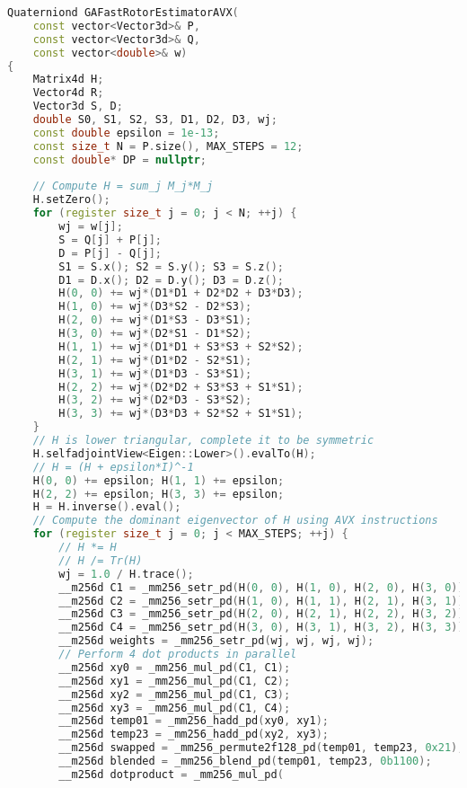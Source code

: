 \documentclass{birkjour}
\numberwithin{equation}{section}
\begin{document}
\begin{lstlisting}[language=C++, caption=C++ code for rotor estimation, basicstyle=\tiny, keywordstyle=\bfseries, label=lst:cppcode, morekeywords={Matrix4d,Vector4d,Vector3d,Quaterniond,sqrt,__m256d,__m128d}]
Quaterniond GAFastRotorEstimatorAVX(
    const vector<Vector3d>& P, 
    const vector<Vector3d>& Q, 
    const vector<double>& w)
{
    Matrix4d H;
    Vector4d R;
    Vector3d S, D;
    double S0, S1, S2, S3, D1, D2, D3, wj;
    const double epsilon = 1e-13;
    const size_t N = P.size(), MAX_STEPS = 12;
    const double* DP = nullptr;
    
    // Compute H = sum_j M_j*M_j
    H.setZero();
    for (register size_t j = 0; j < N; ++j) {
        wj = w[j];
        S = Q[j] + P[j];
        D = P[j] - Q[j];
        S1 = S.x(); S2 = S.y(); S3 = S.z();
        D1 = D.x(); D2 = D.y(); D3 = D.z();
        H(0, 0) += wj*(D1*D1 + D2*D2 + D3*D3); 
        H(1, 0) += wj*(D3*S2 - D2*S3); 
        H(2, 0) += wj*(D1*S3 - D3*S1); 
        H(3, 0) += wj*(D2*S1 - D1*S2);
        H(1, 1) += wj*(D1*D1 + S3*S3 + S2*S2);
        H(2, 1) += wj*(D1*D2 - S2*S1);
        H(3, 1) += wj*(D1*D3 - S3*S1);
        H(2, 2) += wj*(D2*D2 + S3*S3 + S1*S1);
        H(3, 2) += wj*(D2*D3 - S3*S2);
        H(3, 3) += wj*(D3*D3 + S2*S2 + S1*S1);
    }
    // H is lower triangular, complete it to be symmetric
    H.selfadjointView<Eigen::Lower>().evalTo(H);
    // H = (H + epsilon*I)^-1
    H(0, 0) += epsilon; H(1, 1) += epsilon;
    H(2, 2) += epsilon; H(3, 3) += epsilon;
    H = H.inverse().eval();
    // Compute the dominant eigenvector of H using AVX instructions
    for (register size_t j = 0; j < MAX_STEPS; ++j) {
        // H *= H
        // H /= Tr(H)
        wj = 1.0 / H.trace();
        __m256d C1 = _mm256_setr_pd(H(0, 0), H(1, 0), H(2, 0), H(3, 0));
        __m256d C2 = _mm256_setr_pd(H(1, 0), H(1, 1), H(2, 1), H(3, 1));
        __m256d C3 = _mm256_setr_pd(H(2, 0), H(2, 1), H(2, 2), H(3, 2));
        __m256d C4 = _mm256_setr_pd(H(3, 0), H(3, 1), H(3, 2), H(3, 3));
        __m256d weights = _mm256_setr_pd(wj, wj, wj, wj);
        // Perform 4 dot products in parallel
        __m256d xy0 = _mm256_mul_pd(C1, C1);
        __m256d xy1 = _mm256_mul_pd(C1, C2);
        __m256d xy2 = _mm256_mul_pd(C1, C3);
        __m256d xy3 = _mm256_mul_pd(C1, C4);
        __m256d temp01 = _mm256_hadd_pd(xy0, xy1);
        __m256d temp23 = _mm256_hadd_pd(xy2, xy3);
        __m256d swapped = _mm256_permute2f128_pd(temp01, temp23, 0x21);
        __m256d blended = _mm256_blend_pd(temp01, temp23, 0b1100);
        __m256d dotproduct = _mm256_mul_pd(

\end{lstlisting}
\end{document}
